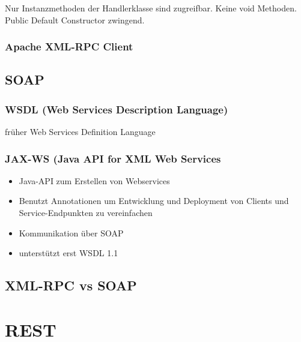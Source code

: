 \documentclass[10pt]{article}
\begin{document}
Nur Instanzmethoden der Handlerklasse sind zugreifbar. Keine void Methoden. Public Default Constructor zwingend.

\subsubsection{Apache XML-RPC Client}



\subsection{SOAP}
\subsubsection{WSDL (Web Services Description Language)}
früher Web Services Definition Language
\subsubsection{JAX-WS (Java API for XML Web Services}
\begin{itemize}
\item Java-API zum Erstellen von Webservices
\item Benutzt Annotationen um Entwicklung und Deployment von Clients und Service-Endpunkten zu vereinfachen
\item Kommunikation über SOAP
\item unterstützt erst WSDL 1.1
\end{itemize}

\subsection{XML-RPC vs SOAP}

\section{REST}

\end{document}
